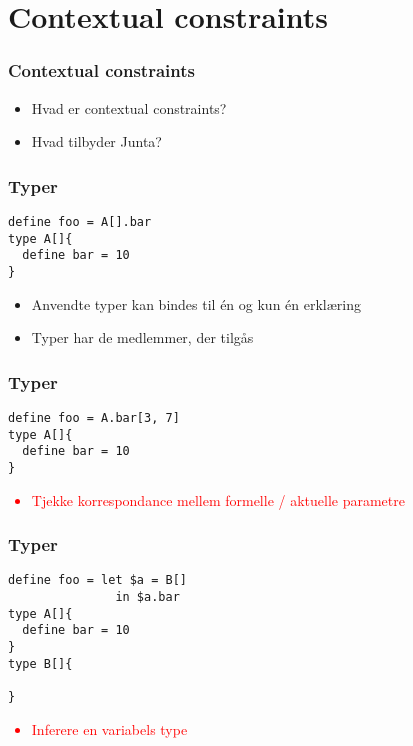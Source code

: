 \section{Contextual constraints}

\begin{frame}
\frametitle{Contextual constraints}
\begin{center}
\begin{itemize}
\item Hvad er contextual constraints?
\item Hvad tilbyder Junta?
\end{itemize}
\end{center}
\end{frame}


\begin{frame}[fragile]
\frametitle{Typer}
\begin{lstlisting}
define foo = A[].bar
type A[]{
  define bar = 10
}
\end{lstlisting}
\begin{center}
\begin{itemize}                                  
\item Anvendte typer kan bindes til én og kun én erklæring
\item Typer har de medlemmer, der tilgås
\end{itemize}
\end{center}
\end{frame}

\begin{frame}[fragile]

\end{frame}

\begin{frame}[fragile]
\frametitle{Typer}
\begin{lstlisting}
define foo = A.bar[3, 7]
type A[]{
  define bar = 10
}
\end{lstlisting}
\begin{center}
\textcolor{red}{
\begin{itemize}                                  
\item Tjekke korrespondance mellem formelle / aktuelle parametre
\end{itemize}
}
\end{center}
\end{frame}

\begin{frame}[fragile]
\frametitle{Typer}
\begin{lstlisting}
define foo = let $a = B[]
               in $a.bar
type A[]{
  define bar = 10
}
type B[]{

}
\end{lstlisting}
\begin{center}
\textcolor{red}{
\begin{itemize}                                  
\item Inferere en variabels type
\end{itemize}
}
\end{center}
\end{frame}

